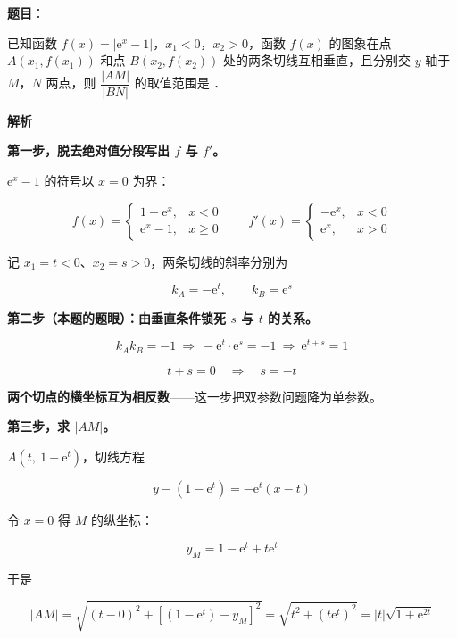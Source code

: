 \begin{answer}

\textbf{题目}：

已知函数 $f(x)=\left|\mathrm e^{x}-1\right|$，$x_1<0$，$x_2>0$，函数 $f(x)$ 的图象在点 $A\left(x_1,f\left(x_1\right)\right)$ 和点 $B\left(x_2,f\left(x_2\right)\right)$ 处的两条切线互相垂直，且分别交 $y$ 轴于 $M$，$N$ 两点，则 $\dfrac{|AM|}{|BN|}$ 的取值范围是 \gkblank{}．

\textbf{解析}

\textbf{第一步，脱去绝对值分段写出 $f$ 与 $f'$。}

$\mathrm e^{x}-1$ 的符号以 $x=0$ 为界：

\nopagebreak[4]
\[f(x)=\begin{cases}1-\mathrm e^{x},&x<0\\ \mathrm e^{x}-1,&x\ge0\end{cases}\qquad f'(x)=\begin{cases}-\mathrm e^{x},&x<0\\ \mathrm e^{x},&x>0\end{cases}\]

记 $x_1=t<0$、$x_2=s>0$，两条切线的斜率分别为

\nopagebreak[4]
\[k_A=-\mathrm e^{t},\qquad k_B=\mathrm e^{s}\]

\textbf{第二步（本题的题眼）：由垂直条件锁死 $s$ 与 $t$ 的关系。}

\nopagebreak[4]
\[k_Ak_B=-1\ \Longrightarrow\ -\mathrm e^{t}\cdot\mathrm e^{s}=-1\ \Longrightarrow\ \mathrm e^{t+s}=1\]

\nopagebreak[4]
\[t+s=0\quad\Longrightarrow\quad s=-t\]

\textbf{两个切点的横坐标互为相反数}——这一步把双参数问题降为单参数。

\textbf{第三步，求 $|AM|$。}

$A\left(t,\ 1-\mathrm e^{t}\right)$，切线方程

\nopagebreak[4]
\[y-\left(1-\mathrm e^{t}\right)=-\mathrm e^{t}(x-t)\]

令 $x=0$ 得 $M$ 的纵坐标：

\nopagebreak[4]
\[y_M=1-\mathrm e^{t}+t\mathrm e^{t}\]

于是

\nopagebreak[4]
\[|AM|=\sqrt{(t-0)^{2}+\left[\left(1-\mathrm e^{t}\right)-y_M\right]^{2}}=\sqrt{t^{2}+\left(t\mathrm e^{t}\right)^{2}}=|t|\sqrt{1+\mathrm e^{2t}}\]


\end{answer}
